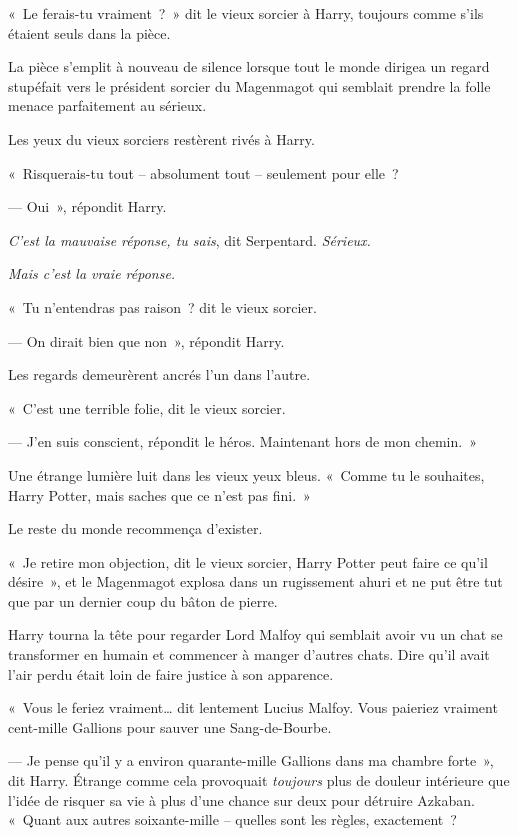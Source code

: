 «~Le ferais-tu vraiment~?~»
dit le vieux sorcier à Harry, toujours comme s'ils étaient seuls dans la pièce.

La pièce s'emplit à nouveau de silence lorsque tout le monde dirigea un regard stupéfait vers le président sorcier du Magenmagot qui semblait prendre la folle menace parfaitement au sérieux.

Les yeux du vieux sorciers restèrent rivés à Harry.

«~Risquerais-tu tout -- absolument tout -- seulement pour elle~?

--- Oui~», répondit Harry.

\emph{C'est la mauvaise réponse, tu sais}, dit Serpentard.
\emph{Sérieux.}

\emph{Mais c'est la vraie réponse.}

«~Tu n'entendras pas raison~? dit le vieux sorcier.

--- On dirait bien que non~», répondit Harry.

Les regards demeurèrent ancrés l'un dans l'autre.

«~C'est une terrible folie, dit le vieux sorcier.

--- J'en suis conscient, répondit le héros.
Maintenant hors de mon chemin.~»

Une étrange lumière luit dans les vieux yeux bleus.
«~Comme tu le souhaites, Harry Potter, mais saches que ce n'est pas fini.~»

Le reste du monde recommença d'exister.

«~Je retire mon objection, dit le vieux sorcier, Harry Potter peut faire ce qu'il désire~», et le Magenmagot explosa dans un rugissement ahuri et ne put être tut que par un dernier coup du bâton de pierre.

Harry tourna la tête pour regarder Lord Malfoy qui semblait avoir vu un chat se transformer en humain et commencer à manger d'autres chats.
Dire qu'il avait l'air perdu était loin de faire justice à son apparence.

«~Vous le feriez vraiment… dit lentement Lucius Malfoy.
Vous paieriez vraiment cent-mille Gallions pour sauver une Sang-de-Bourbe.

--- Je pense qu'il y a environ quarante-mille Gallions dans ma chambre forte~», dit Harry.
Étrange comme cela provoquait \emph{toujours} plus de douleur intérieure que l'idée de risquer sa vie à plus d'une chance sur deux pour détruire Azkaban.
«~Quant aux autres soixante-mille -- quelles sont les règles, exactement~?

